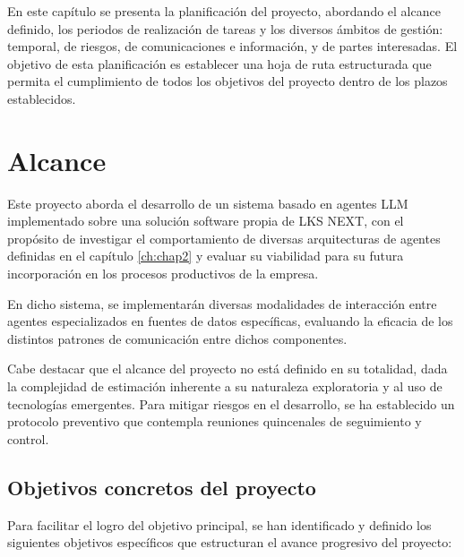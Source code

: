 

En este capítulo se presenta la planificación del proyecto, abordando el alcance definido, los periodos de realización de tareas y los diversos ámbitos de gestión: temporal, de riesgos, de comunicaciones e información, y de partes interesadas. El objetivo de esta planificación es establecer una hoja de ruta estructurada que permita el cumplimiento de todos los objetivos del proyecto dentro de los plazos establecidos.

\section{Alcance}

Este proyecto aborda el desarrollo de un sistema basado en agentes LLM implementado sobre una solución software propia de LKS NEXT, con el propósito de investigar el comportamiento de diversas arquitecturas de agentes definidas en el capítulo \ref{ch:chap2} y evaluar su viabilidad para su futura incorporación en los procesos productivos de la empresa.

En dicho sistema, se implementarán diversas modalidades de interacción entre agentes especializados en fuentes de datos específicas, evaluando la eficacia de los distintos patrones de comunicación entre dichos componentes.

Cabe destacar que el alcance del proyecto no está definido en su totalidad, dada la complejidad de estimación inherente a su naturaleza exploratoria y al uso de tecnologías emergentes. Para mitigar riesgos en el desarrollo, se ha establecido un protocolo preventivo que contempla reuniones quincenales de seguimiento y control.

\subsection{Objetivos concretos del proyecto}

Para facilitar el logro del objetivo principal, se han identificado y definido los siguientes objetivos específicos que estructuran el avance progresivo del proyecto:

